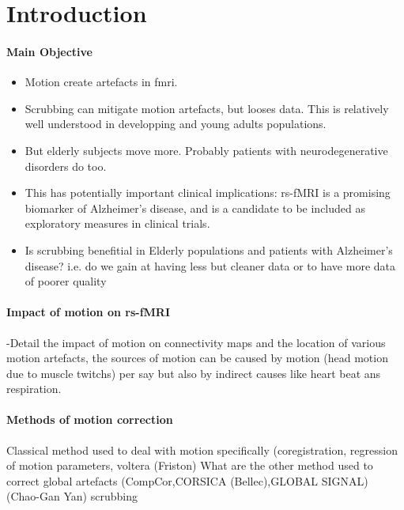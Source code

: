 \documentclass[authoryear]{elsarticle}
\begin{document}
\section{Introduction}


\paragraph{Main Objective} 

\begin{itemize}
 \item Motion create artefacts in fmri.
 \item Scrubbing can mitigate motion artefacts, but looses data. This is relatively well understood in developping and young adults populations.
 \item But elderly subjects move more. Probably patients with neurodegenerative disorders do too.
 \item This has potentially important clinical implications: rs-fMRI is a promising biomarker of Alzheimer's disease, and is a candidate to be included as exploratory measures in clinical trials. 
 \item Is scrubbing benefitial in Elderly populations and patients with Alzheimer's disease? i.e. do we gain at having less but cleaner data or to have more data of poorer quality
\end{itemize}

\paragraph{Impact of motion on rs-fMRI} 
-Detail the impact of motion on connectivity maps and the location of various motion artefacts, the sources of motion can be caused by motion (head motion due to muscle twitchs) 
per say but also by indirect causes like heart beat ans respiration.

\paragraph{Methods of motion correction} 
Classical method used to deal with motion specifically (coregistration, regression of motion parameters, voltera (Friston) 
What are the other method used to correct global artefacts (CompCor,CORSICA (Bellec),GLOBAL SIGNAL) (Chao-Gan Yan)
scrubbing

\end{document}
